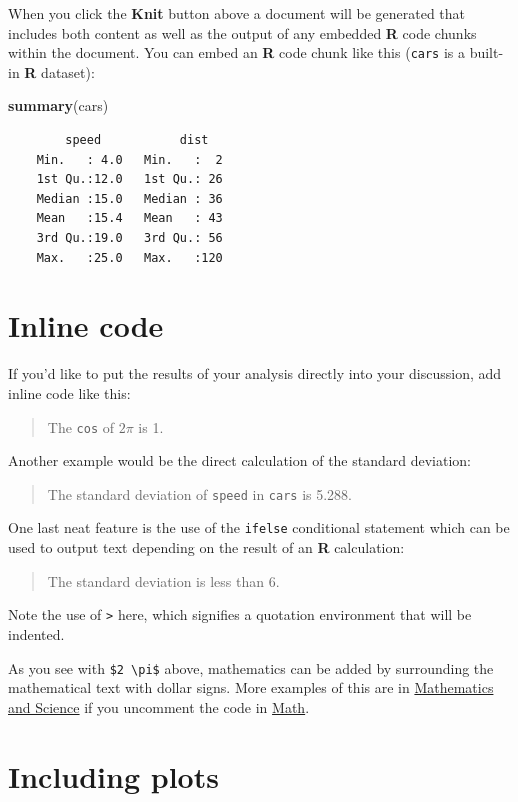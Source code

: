 \documentclass[12pt, twoside]{amherstthesis}
\newenvironment{Shaded}{\begin{snugshade}}{\end{snugshade}}
\newcommand{\KeywordTok}[1]{\textcolor[rgb]{0.13,0.29,0.53}{\textbf{#1}}}
\newcommand{\NormalTok}[1]{#1}
\theoremstyle{definition}
\theoremstyle{definition}
\theoremstyle{definition}
\theoremstyle{remark}
\begin{document}
When you click the \textbf{Knit} button above a document will be generated that includes both content as well as the output of any embedded \textbf{R} code chunks within the document. You can embed an \textbf{R} code chunk like this (\texttt{cars} is a built-in \textbf{R} dataset):
\begin{Shaded}
\begin{Highlighting}[]
\KeywordTok{summary}\NormalTok{(cars)}
\end{Highlighting}
\end{Shaded}
\begin{verbatim}
        speed           dist    
    Min.   : 4.0   Min.   :  2  
    1st Qu.:12.0   1st Qu.: 26  
    Median :15.0   Median : 36  
    Mean   :15.4   Mean   : 43  
    3rd Qu.:19.0   3rd Qu.: 56  
    Max.   :25.0   Max.   :120
\end{verbatim}
\hypertarget{inline-code}{%
\section{Inline code}\label{inline-code}}

If you'd like to put the results of your analysis directly into your discussion, add inline code like this:
\begin{quote}
The \texttt{cos} of \(2 \pi\) is 1.
\end{quote}
Another example would be the direct calculation of the standard deviation:
\begin{quote}
The standard deviation of \texttt{speed} in \texttt{cars} is 5.288.
\end{quote}
One last neat feature is the use of the \texttt{ifelse} conditional statement which can be used to output text depending on the result of an \textbf{R} calculation:
\begin{quote}
The standard deviation is less than 6.
\end{quote}
Note the use of \texttt{\textgreater{}} here, which signifies a quotation environment that will be indented.

As you see with \texttt{\$2\ \textbackslash{}pi\$} above, mathematics can be added by surrounding the mathematical text with dollar signs. More examples of this are in \protect\hyperlink{math-sci}{Mathematics and Science} if you uncomment the code in \protect\hyperlink{math}{Math}.

\hypertarget{including-plots}{%
\section{Including plots}\label{including-plots}}
\end{document}

